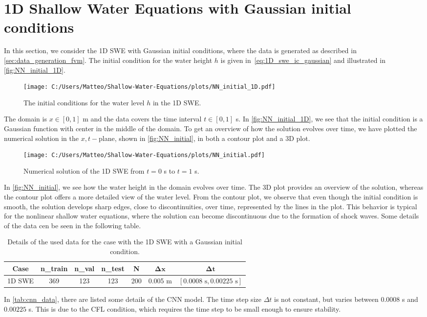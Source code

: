 \section{1D Shallow Water Equations with Gaussian initial conditions}
In this section, we consider the 1D SWE with Gaussian initial conditions, where the data is generated as described in \autoref{sec:data_generation_fvm}.
The initial condition for the water height $h$ is given in~\eqref{eq:1D_swe_ic_gaussian} and illustrated in \autoref{fig:NN_initial_1D}.
\begin{figure}[H]
    \centering
    \texttt{[image: C:/Users/Matteo/Shallow-Water-Equations/plots/NN\_initial\_1D.pdf]}
    \caption{The initial conditions for the water level $h$ in the 1D SWE.}\label{fig:NN_initial_1D}
\end{figure}
The domain is $ x \in [0, 1]$ m and the data covers the time interval $t \in [0, 1]$ s.
In \autoref{fig:NN_initial_1D}, we see that the initial condition is a Gaussian function with center in the middle of the domain.
To get an overview of how the solution evolves over time, we have plotted the numerical solution in the $x,t-$plane, shown in \autoref{fig:NN_initial}, in both a contour plot and a 3D plot.
\begin{figure}[H]
    \hspace{1.7cm} %
    \texttt{[image: C:/Users/Matteo/Shallow-Water-Equations/plots/NN\_initial.pdf]}
    \caption{Numerical solution of the 1D SWE from $t = 0$ s to $t = 1$ s.}\label{fig:NN_initial}
\end{figure}
In \autoref{fig:NN_initial}, we see how the water height in the domain evolves over time.
The 3D plot provides an overview of the solution, whereas the contour plot offers a more detailed view of the water level.
From the contour plot, we observe that even though the initial condition is smooth, the solution develops sharp edges, close to discontinuities, over time, represented by the lines in the plot.
This behavior is typical for the nonlinear shallow water equations, where the solution can become discontinuous due to the formation of shock waves.
Some details of the data cen be seen in the following table.
\begin{table}[H]
    \centering
    \begin{tabular}{c|cccccc}
        \textbf{Case} & \textbf{n\_train} & \textbf{n\_val} & \textbf{n\_test} & \textbf{N} & $\mathbf{\Delta x}$ & $\mathbf{\Delta t}$ \\
        \hline
        1D SWE & 369 & 123 & 123 & 200 & 0.005 m & $[0.0008 \text{ s}, 0.00225 \text{ s}]$ \\
    \end{tabular}
    \caption{Details of the used data for the case with the 1D SWE with a Gaussian initial condition.}\label{tab:cnn_data}
\end{table}
In \autoref{tab:cnn_data}, there are listed some details of the CNN model.
The time step size $\Delta t$ is not constant, but varies between $0.0008$ s and $0.00225$ s.
This is due to the CFL condition, which requires the time step to be small enough to ensure stability.


